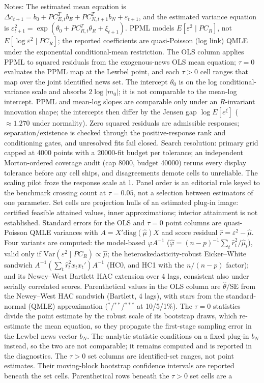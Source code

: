\documentclass[11pt]{article}
\begin{document}
\begin{table}[!htbp]
\begin{threeparttable}
\begin{tablenotes}[flushleft]
\item Notes: The estimated mean equation is $\Delta c_{t+1}=b_{0}+PC_{E,t}^{T}b_{E}+ PC_{N,t+1}^{T}b_{N}+\varepsilon_{t+1}$, and the estimated variance equation is $\varepsilon_{t+1}^{2}= \exp(\theta_{0}+PC_{R,t}^{T}\theta_{R}+\xi_{t+1})$. PPML models $E[\varepsilon^2 \mid PC_R]$, not $E[\log \varepsilon^2 \mid PC_R]$; the reported coefficients are quasi-Poisson (log link) QMLE under the exponential conditional-mean restriction. The OLS column applies PPML to squared residuals from the exogenous-news OLS mean equation; $\tau{=}0$ evaluates the PPML map at the Lewbel point, and each $\tau{>}0$ cell ranges that map over the joint identified news set. The intercept $\theta_0$ is on the log conditional-variance scale and absorbs $2\log|m_0|$; it is not comparable to the mean-log intercept. PPML and mean-log slopes are comparable only under an $R$-invariant innovation shape; the intercepts then differ by the Jensen gap $\log E[e^{\xi}]$ ($\approx 1.270$ under normality). Zero squared residuals are admissible responses; separation/existence is checked through the positive-response rank and conditioning gates, and unresolved fits fail closed. Search resolution: primary grid capped at 4000 points with a 20000-fit budget per tolerance; an independent Morton-ordered coverage audit (cap 8000, budget 40000) reruns every display tolerance before any cell ships, and disagreements demote cells to unreliable. The scaling pilot froze the response scale at 1. Panel order is an editorial rule keyed to the benchmark crossing count at $\tau{=}0.05$, not a selection between estimators of one parameter. Set cells are projection hulls of an estimated plug-in image: certified feasible attained values, inner approximations; interior attainment is not established. Standard errors for the OLS and $\tau{=}0$ point columns are quasi-Poisson QMLE variances with $A = X'\mathrm{diag}(\hat\mu)X$ and score residual $\hat r = \varepsilon^2 - \hat\mu$. Four variants are computed: the model-based $\hat\varphi A^{-1}$ ($\hat\varphi = (n{-}p)^{-1}\sum_t \hat r_t^2/\hat\mu_t$), valid only if $\mathrm{Var}(\varepsilon^2 \mid PC_R) \propto \hat\mu$; the heteroskedasticity-robust Eicker--White sandwich $A^{-1}(\sum_t \hat r_t^2 x_t x_t')A^{-1}$ (HC0, and HC1 with the $n/(n{-}p)$ factor); and its Newey--West Bartlett HAC extension over 4 lags, consistent also under serially correlated scores. Parenthetical values in the OLS column are $\hat\theta/\mathrm{SE}$ from the Newey--West HAC sandwich (Bartlett, 4 lags), with stars from the standard-normal (QMLE) approximation ($^{*}$/$^{**}$/$^{***}$ at 10/5/1\%). The $\tau{=}0$ statistics divide the point estimate by the robust scale of its bootstrap draws, which re-estimate the mean equation, so they propagate the first-stage sampling error in the Lewbel news vector $b_N$. The analytic statistic conditions on a fixed plug-in $b_N$ instead, so the two are not comparable; it remains computed and is reported in the diagnostics. The $\tau{>}0$ set columns are identified-set ranges, not point estimates. Their moving-block bootstrap confidence intervals are reported beneath the set cells. Parenthetical rows beneath the $\tau{>}0$ set cells are a 
\end{tablenotes}
\end{threeparttable}
\end{table}
\end{document}

